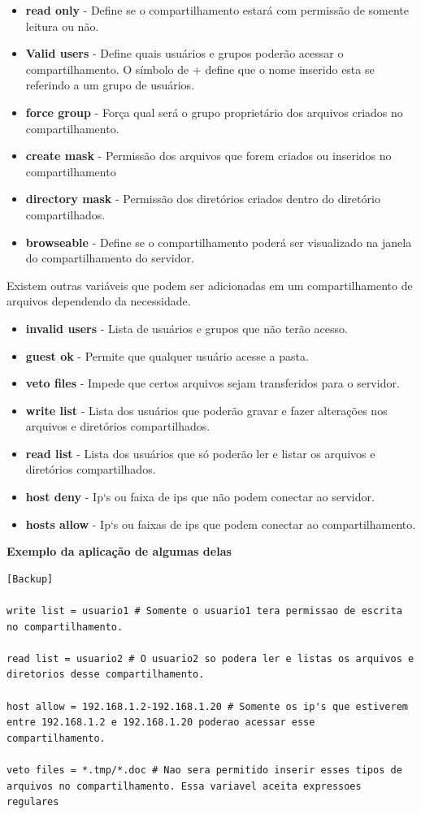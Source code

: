 \begin{itemize}
	\item \textbf{read only} - Define se o compartilhamento estará com permissão de somente leitura ou não.
	\item \textbf{Valid users} - Define quais usuários e grupos poderão acessar o compartilhamento. O símbolo de + define que o nome inserido esta se referindo a um grupo de usuários.
	\item \textbf{force group} - Força qual será o grupo proprietário dos arquivos criados no compartilhamento.
	\item \textbf{create mask} - Permissão dos arquivos que forem criados ou inseridos no compartilhamento
	\item \textbf{directory mask} - Permissão dos diretórios criados dentro do diretório compartilhados.
	\item \textbf{browseable} - Define se o compartilhamento poderá ser visualizado na janela do compartilhamento do servidor.
\end{itemize}

Existem outras variáveis que podem ser adicionadas em um compartilhamento de arquivos dependendo da necessidade.

\begin{itemize}
	\item \textbf{invalid users} - Lista de usuários e grupos que não terão acesso.
	\item \textbf{guest ok} - Permite que qualquer usuário acesse a pasta.
	\item \textbf{veto files} - Impede que certos arquivos sejam transferidos para o servidor.
	\item \textbf{write list} - Lista dos usuários que poderão gravar e fazer alterações nos arquivos e diretórios compartilhados.
	\item \textbf{read list} - Lista dos usuários que só poderão ler e listar os arquivos e diretórios compartilhados.
	\item \textbf{host deny} - Ip`s ou faixa de ips que não podem conectar ao servidor.
	\item \textbf{hosts allow} - Ip`s ou faixas de ips que podem conectar ao compartilhamento.
\end{itemize}

\textbf{Exemplo da aplicação de algumas delas}\\

\begin{lstlisting}	
[Backup]

write list = usuario1 # Somente o usuario1 tera permissao de escrita no compartilhamento.

read list = usuario2 # O usuario2 so podera ler e listas os arquivos e diretorios desse compartilhamento.

host allow = 192.168.1.2-192.168.1.20 # Somente os ip's que estiverem entre 192.168.1.2 e 192.168.1.20 poderao acessar esse compartilhamento.

veto files = *.tmp/*.doc # Nao sera permitido inserir esses tipos de arquivos no compartilhamento. Essa variavel aceita expressoes regulares
\end{lstlisting}

